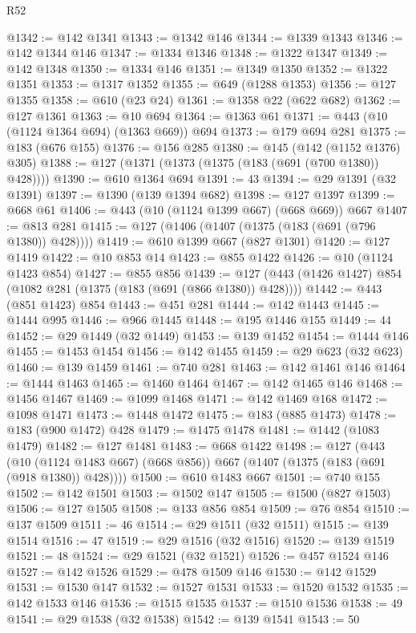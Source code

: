 \begin{lexlean}{R52}
\begin{coremodule}
@1342 := @142 @1341
@1343 := @1342 @146
@1344 := @1339 @1343
@1346 := @142 @1344 @146
@1347 := @1334 @1346
@1348 := @1322 @1347
@1349 := @142 @1348
@1350 := @1334 @146
@1351 := @1349 @1350
@1352 := @1322 @1351
@1353 := @1317 @1352
@1355 := @649 (@1288 @1353)
@1356 := @127 @1355
@1358 := @610 (@23 @24)
@1361 := @1358 @22 (@622 @682)
@1362 := @127 @1361
@1363 := @10 @694
@1364 := @1363 @61
@1371 := @443 (@10 (@1124 @1364 @694) (@1363 @669)) @694
@1373 := @179 @694 @281
@1375 := @183 (@676 @155)
@1376 := @156 @285
@1380 := @145 (@142 (@1152 @1376) @305)
@1388 := @127 (@1371 (@1373 (@1375 (@183 (@691 (@700 @1380)) @428))))
@1390 := @610 @1364 @694
@1391 := 43
@1394 := @29 @1391 (@32 @1391)
@1397 := @1390 (@139 @1394 @682)
@1398 := @127 @1397
@1399 := @668 @61
@1406 := @443 (@10 (@1124 @1399 @667) (@668 @669)) @667
@1407 := @813 @281
@1415 := @127 (@1406 (@1407 (@1375 (@183 (@691 (@796 @1380)) @428))))
@1419 := @610 @1399 @667 (@827 @1301)
@1420 := @127 @1419
@1422 := @10 @853 @14
@1423 := @855 @1422
@1426 := @10 (@1124 @1423 @854)
@1427 := @855 @856
@1439 := @127 (@443 (@1426 @1427) @854 (@1082 @281 (@1375 (@183 (@691 (@866 @1380)) @428))))
@1442 := @443 (@851 @1423) @854
@1443 := @451 @281
@1444 := @142 @1443
@1445 := @1444 @995
@1446 := @966 @1445
@1448 := @195 @1446 @155
@1449 := 44
@1452 := @29 @1449 (@32 @1449)
@1453 := @139 @1452
@1454 := @1444 @146
@1455 := @1453 @1454
@1456 := @142 @1455
@1459 := @29 @623 (@32 @623)
@1460 := @139 @1459
@1461 := @740 @281
@1463 := @142 @1461 @146
@1464 := @1444 @1463
@1465 := @1460 @1464
@1467 := @142 @1465 @146
@1468 := @1456 @1467
@1469 := @1099 @1468
@1471 := @142 @1469 @168
@1472 := @1098 @1471
@1473 := @1448 @1472
@1475 := @183 (@885 @1473)
@1478 := @183 (@900 @1472) @428
@1479 := @1475 @1478
@1481 := @1442 (@1083 @1479)
@1482 := @127 @1481
@1483 := @668 @1422
@1498 := @127
    (@443 (@10 (@1124 @1483 @667) (@668 @856)) @667 (@1407 (@1375 (@183 (@691 (@918 @1380)) @428))))
@1500 := @610 @1483 @667
@1501 := @740 @155
@1502 := @142 @1501
@1503 := @1502 @147
@1505 := @1500 (@827 @1503)
@1506 := @127 @1505
@1508 := @133 @856 @854
@1509 := @76 @854
@1510 := @137 @1509
@1511 := 46
@1514 := @29 @1511 (@32 @1511)
@1515 := @139 @1514
@1516 := 47
@1519 := @29 @1516 (@32 @1516)
@1520 := @139 @1519
@1521 := 48
@1524 := @29 @1521 (@32 @1521)
@1526 := @457 @1524 @146
@1527 := @142 @1526
@1529 := @478 @1509 @146
@1530 := @142 @1529
@1531 := @1530 @147
@1532 := @1527 @1531
@1533 := @1520 @1532
@1535 := @142 @1533 @146
@1536 := @1515 @1535
@1537 := @1510 @1536
@1538 := 49
@1541 := @29 @1538 (@32 @1538)
@1542 := @139 @1541
@1543 := 50

\end{coremodule}
\end{lexlean}
